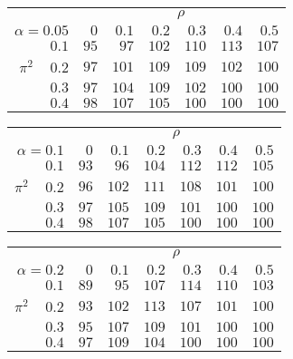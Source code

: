 \begin{tabular}{r|rrrrrr}
\hline\hline
 &\multicolumn{6}{c}{$\rho$} \\ 
 $\alpha = 0.05$ & $0$ & $0.1$ & $0.2$ & $0.3$ & $0.4$ & $0.5$ \\ 
 \hline$0.1$ & $ 95$ & $ 97$ & $102$ & $110$ & $113$ & $107$\\ 
$\pi^2\;\;\;$ $0.2$ & $ 97$ & $101$ & $109$ & $109$ & $102$ & $100$\\ 
$0.3$ & $ 97$ & $104$ & $109$ & $102$ & $100$ & $100$\\ 
$0.4$ & $ 98$ & $107$ & $105$ & $100$ & $100$ & $100$\\ 
 \hline 
 \end{tabular}
 
 \vspace{2em} 
 
\begin{tabular}{r|rrrrrr}
\hline\hline
 &\multicolumn{6}{c}{$\rho$} \\ 
 $\alpha = 0.1$ & $0$ & $0.1$ & $0.2$ & $0.3$ & $0.4$ & $0.5$ \\ 
 \hline$0.1$ & $ 93$ & $ 96$ & $104$ & $112$ & $112$ & $105$\\ 
$\pi^2\;\;\;$ $0.2$ & $ 96$ & $102$ & $111$ & $108$ & $101$ & $100$\\ 
$0.3$ & $ 97$ & $105$ & $109$ & $101$ & $100$ & $100$\\ 
$0.4$ & $ 98$ & $107$ & $105$ & $100$ & $100$ & $100$\\ 
 \hline 
 \end{tabular}
 
 \vspace{2em} 
 
\begin{tabular}{r|rrrrrr}
\hline\hline
 &\multicolumn{6}{c}{$\rho$} \\ 
 $\alpha = 0.2$ & $0$ & $0.1$ & $0.2$ & $0.3$ & $0.4$ & $0.5$ \\ 
 \hline$0.1$ & $ 89$ & $ 95$ & $107$ & $114$ & $110$ & $103$\\ 
$\pi^2\;\;\;$ $0.2$ & $ 93$ & $102$ & $113$ & $107$ & $101$ & $100$\\ 
$0.3$ & $ 95$ & $107$ & $109$ & $101$ & $100$ & $100$\\ 
$0.4$ & $ 97$ & $109$ & $104$ & $100$ & $100$ & $100$\\ 
 \hline 
 \end{tabular}